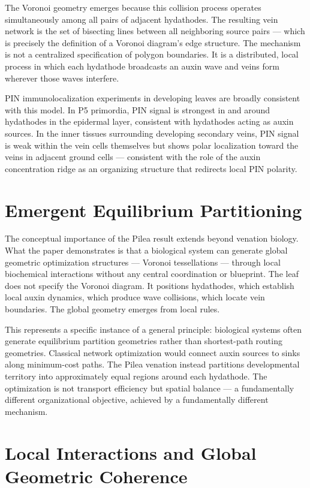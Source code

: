 \documentclass[12pt, a4paper, openany]{book}
\theoremstyle{definition}
\theoremstyle{remark}
\begin{document}
The Voronoi geometry emerges because this collision process operates simultaneously among all pairs of adjacent hydathodes. The resulting vein network is the set of bisecting lines between all neighboring source pairs — which is precisely the definition of a Voronoi diagram's edge structure. The mechanism is not a centralized specification of polygon boundaries. It is a distributed, local process in which each hydathode broadcasts an auxin wave and veins form wherever those waves interfere.

PIN immunolocalization experiments in developing leaves are broadly consistent with this model. In P5 primordia, PIN signal is strongest in and around hydathodes in the epidermal layer, consistent with hydathodes acting as auxin sources. In the inner tissues surrounding developing secondary veins, PIN signal is weak within the vein cells themselves but shows polar localization toward the veins in adjacent ground cells — consistent with the role of the auxin concentration ridge as an organizing structure that redirects local PIN polarity.

\section{Emergent Equilibrium Partitioning}

The conceptual importance of the Pilea result extends beyond venation biology. What the paper demonstrates is that a biological system can generate global geometric optimization structures — Voronoi tessellations — through local biochemical interactions without any central coordination or blueprint. The leaf does not specify the Voronoi diagram. It positions hydathodes, which establish local auxin dynamics, which produce wave collisions, which locate vein boundaries. The global geometry emerges from local rules.

This represents a specific instance of a general principle: biological systems often generate equilibrium partition geometries rather than shortest-path routing geometries. Classical network optimization would connect auxin sources to sinks along minimum-cost paths. The Pilea venation instead partitions developmental territory into approximately equal regions around each hydathode. The optimization is not transport efficiency but spatial balance — a fundamentally different organizational objective, achieved by a fundamentally different mechanism.

\section{Local Interactions and Global Geometric Coherence}
\end{document}
